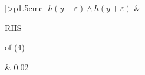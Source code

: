 \documentclass{article}
\begin{document}
\begin{tabular}{|>{\centering}p{1.5cm}c|}
\hline
$h(y-\varepsilon)\land h(y+\varepsilon)$ & \begin{varwidth}[t]{\linewidth}\centering RHS\par of (4)\end{varwidth}\tabularnewline
{} & 0.02\tabularnewline
\hline
\end{tabular}
\end{document}
